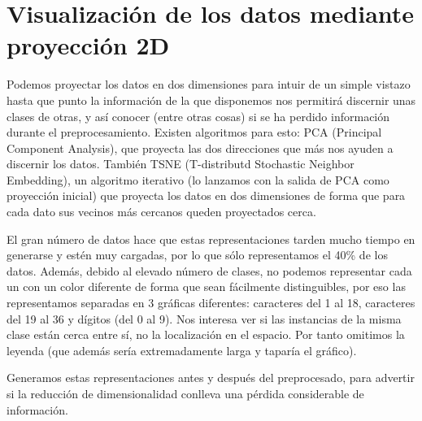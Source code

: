 \documentclass[a4]{article}
\begin{document}
\section{Visualización de los datos mediante proyección 2D}

Podemos proyectar los datos en dos dimensiones para intuir de un
simple vistazo hasta que punto la información de la que disponemos nos
permitirá discernir unas clases de otras, y así conocer (entre otras
cosas) si se ha perdido información durante el
preprocesamiento. Existen algoritmos para esto: PCA (Principal
Component Analysis), que proyecta las dos direcciones que más nos
ayuden a discernir los datos. También TSNE (T-distributd Stochastic
Neighbor Embedding), un algoritmo iterativo (lo lanzamos con la salida
de PCA como proyección inicial) que proyecta los datos en dos
dimensiones de forma que para cada dato sus vecinos más cercanos
queden proyectados cerca.

El gran número de datos hace que estas representaciones tarden mucho
tiempo en generarse y estén muy cargadas, por lo que sólo
representamos el 40\% de los datos. Además, debido al elevado número
de clases, no podemos representar cada un con un color diferente de
forma que sean fácilmente distinguibles, por eso las representamos
separadas en 3 gráficas diferentes: caracteres del 1 al 18, caracteres
del 19 al 36 y dígitos (del 0 al 9). Nos interesa ver si las
instancias de la misma clase están cerca entre sí, no la localización
en el espacio. Por tanto omitimos la leyenda (que además sería
extremadamente larga y taparía el gráfico).

Generamos estas representaciones antes y después del preprocesado,
para advertir si la reducción de dimensionalidad conlleva una pérdida
considerable de información.
\end{document}
